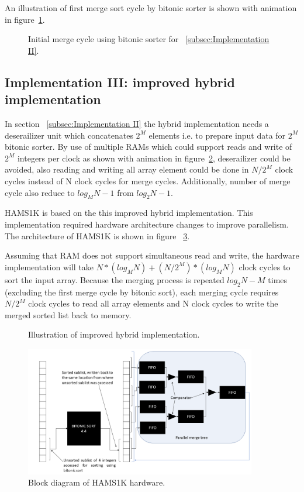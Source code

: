 \documentclass{article}
\begin{document}
An illustration of first merge sort cycle by bitonic sorter is shown with animation in figure~\ref{fig:serial}.

\begin{figure}
\centering

\caption{\label{fig:serial}Initial merge cycle using bitonic sorter for ~\ref{subsec:Implementation II}.}
\end{figure}


\subsection{Implementation III: improved hybrid implementation}
\label{subsec:Implementation III}

In section ~\ref{subsec:Implementation II} the hybrid implementation needs a deserailizer unit which concatenates $2^M$ elements i.e. to prepare input data for $2^M$ bitonic sorter. By use of multiple RAMs which could support reads and write of $2^M$ integers per clock as shown with animation in figure~\ref{fig:impl3}, deserailizer could be avoided, also reading and writing all array element could be done in $N/2^M$ clock cycles instead of N clock cycles for merge cycles. Additionally, number of merge cycle also reduce to $log_MN-1$ from $log_2N-1$.

HAMS1K is based on the this improved hybrid implementation. This implementation required hardware architecture changes to improve parallelism. The architecture of HAMS1K is shown in figure ~\ref{fig:scheme}.

Assuming that RAM does not support simultaneous read and write, the hardware implementation will take $N*(log_MN)+(N/2^M)*(log_MN)$ clock cycles to sort the input array. Because the merging process is repeated $log_2N-M$ times (excluding the first merge cycle by bitonic sort), each merging cycle requires $N/2^M$ clock cycles to read all array elements and N clock cycles to write the merged sorted list back to memory.
\begin{figure}[H]
\centering
\caption{\label{fig:impl3}Illustration of improved hybrid implementation.}
\end{figure}

\begin{figure}[H]
\centering
\includegraphics[width=0.90\textwidth]{hams_scheme.png}
\caption{\label{fig:scheme}Block diagram of HAMS1K hardware.}
\end{figure}
\end{document}
